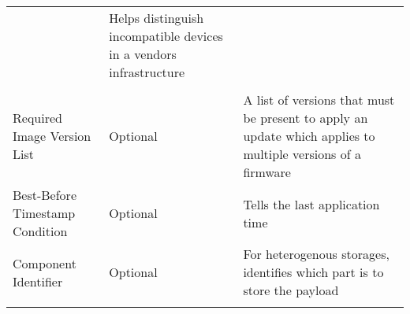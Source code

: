 \begin{longtable}[]{@{}lll@{}}
\begin{minipage}[t]{0.26\columnwidth}
\end{minipage} & \begin{minipage}[t]{0.42\columnwidth}\raggedright\strut
Helps distinguish incompatible devices in a vendors infrastructure\strut
\end{minipage}\tabularnewline
\begin{minipage}[t]{0.23\columnwidth}\raggedright\strut
\strut
\end{minipage} & \begin{minipage}[t]{0.26\columnwidth}\raggedright\strut
\strut
\end{minipage} & \begin{minipage}[t]{0.42\columnwidth}\raggedright\strut
\strut
\end{minipage}\tabularnewline
\begin{minipage}[t]{0.23\columnwidth}\raggedright\strut
Required Image Version List\strut
\end{minipage} & \begin{minipage}[t]{0.26\columnwidth}\raggedright\strut
Optional\strut
\end{minipage} & \begin{minipage}[t]{0.42\columnwidth}\raggedright\strut
A list of versions that must be present to apply an update which applies
to multiple versions of a firmware\strut
\end{minipage}\tabularnewline
\begin{minipage}[t]{0.23\columnwidth}\raggedright\strut
Best-Before Timestamp Condition\strut
\end{minipage} & \begin{minipage}[t]{0.26\columnwidth}\raggedright\strut
Optional\strut
\end{minipage} & \begin{minipage}[t]{0.42\columnwidth}\raggedright\strut
Tells the last application time\strut
\end{minipage}\tabularnewline
\begin{minipage}[t]{0.23\columnwidth}\raggedright\strut
Component Identifier\strut
\end{minipage} & \begin{minipage}[t]{0.26\columnwidth}\raggedright\strut
Optional\strut
\end{minipage} & \begin{minipage}[t]{0.42\columnwidth}\raggedright\strut
For heterogenous storages, identifies which part is to store the
payload\strut
\end{minipage}\tabularnewline
\begin{minipage}[t]{0.23\columnwidth}\raggedright\strut

\end{minipage}
\end{longtable}
